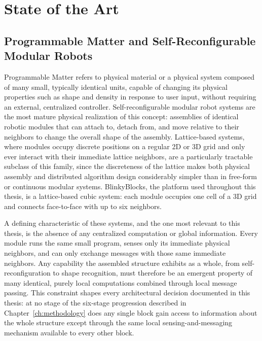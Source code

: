 \documentclass[12pt,a4paper]{report}
\begin{document}
\chapter{State of the Art}
\label{ch:sota}

\section{Programmable Matter and Self-Reconfigurable Modular Robots}

Programmable Matter refers to physical material or a physical system composed of many small, typically identical units, capable of changing its physical properties such as shape and density in response to user input, without requiring an external, centralized controller. Self-reconfigurable modular robot systems are the most mature physical realization of this concept: assemblies of identical robotic modules that can attach to, detach from, and move relative to their neighbors to change the overall shape of the assembly. Lattice-based systems, where modules occupy discrete positions on a regular 2D or 3D grid and only ever interact with their immediate lattice neighbors, are a particularly tractable subclass of this family, since the discreteness of the lattice makes both physical assembly and distributed algorithm design considerably simpler than in free-form or continuous modular systems. BlinkyBlocks, the platform used throughout this thesis, is a lattice-based cubic system: each module occupies one cell of a 3D grid and connects face-to-face with up to six neighbors.

A defining characteristic of these systems, and the one most relevant to this thesis, is the absence of any centralized computation or global information. Every module runs the same small program, senses only its immediate physical neighbors, and can only exchange messages with those same immediate neighbors. Any capability the assembled structure exhibits as a whole, from self-reconfiguration to shape recognition, must therefore be an emergent property of many identical, purely local computations combined through local message passing. This constraint shapes every architectural decision documented in this thesis: at no stage of the six-stage progression described in Chapter~\ref{ch:methodology} does any single block gain access to information about the whole structure except through the same local sensing-and-messaging mechanism available to every other block.
\end{document}
